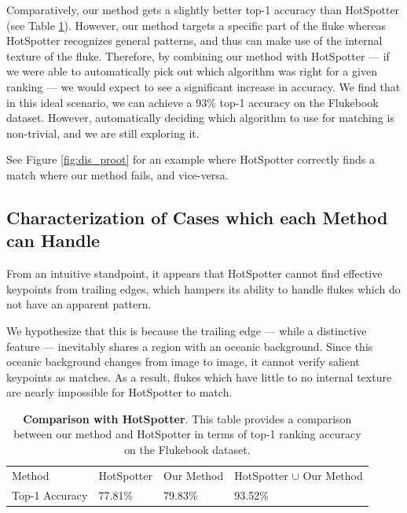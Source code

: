 Comparatively, our method gets a slightly better top-1 accuracy than HotSpotter (see Table \ref{tab:vary_proot}).
However, our method targets a specific part of the fluke whereas HotSpotter recognizes general patterns, and thus can make use of the internal texture of the fluke.
Therefore, by combining our method with HotSpotter --- if we were able to automatically pick out which algorithm was right for a given ranking --- we would expect to see a significant increase in accuracy.
We find that in this ideal scenario, we can achieve a 93\% top-1 accuracy on the Flukebook dataset.
However, automatically deciding which algorithm to use for matching is non-trivial, and we are still exploring it.

See Figure \ref{fig:dis_proot} for an example where HotSpotter correctly finds a match where our method fails, and vice-versa.

\subsection{Characterization of Cases which each Method can Handle}

From an intuitive standpoint, it appears that HotSpotter cannot find effective keypoints from trailing edges, which hampers its ability to handle flukes which do not have an apparent pattern.

We hypothesize that this is because the trailing edge --- while a distinctive feature --- inevitably shares a region with an oceanic background.
Since this oceanic background changes from image to image, it cannot verify salient keypoints as matches.
As a result, flukes which have little to no internal texture are nearly impossible for HotSpotter to match.

\begin{table}[t]%
	\caption{\textbf{Comparison with HotSpotter}. This table provides a comparison between our method and HotSpotter in terms of top-1 ranking accuracy on the Flukebook dataset.}
	\centering
	\resizebox{\linewidth}{!}
	{
		\begin{tabular} {| l || l | l | l |}
		\hline
		Method & HotSpotter & Our Method & HotSpotter $\cup$ Our Method \\
		\hhline{|=#===|}
		Top-1 Accuracy  & 77.81\% & 79.83\% & 93.52\% \\
		\hline
		\end{tabular}
	}
	\label{tab:vary_proot}
\end{table}




